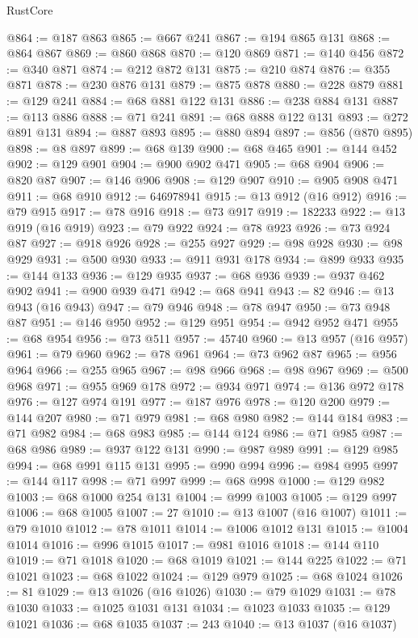 \begin{lexlean}{RustCore}
\begin{coremodule}
@864 := @187 @863
@865 := @667 @241
@867 := @194 @865 @131
@868 := @864 @867
@869 := @860 @868
@870 := @120 @869
@871 := @140 @456
@872 := @340 @871
@874 := @212 @872 @131
@875 := @210 @874
@876 := @355 @871
@878 := @230 @876 @131
@879 := @875 @878
@880 := @228 @879
@881 := @129 @241
@884 := @68 @881 @122 @131
@886 := @238 @884 @131
@887 := @113 @886
@888 := @71 @241
@891 := @68 @888 @122 @131
@893 := @272 @891 @131
@894 := @887 @893
@895 := @880 @894
@897 := @856 (@870 @895)
@898 := @8 @897
@899 := @68 @139
@900 := @68 @465
@901 := @144 @452
@902 := @129 @901
@904 := @900 @902 @471
@905 := @68 @904
@906 := @820 @87
@907 := @146 @906
@908 := @129 @907
@910 := @905 @908 @471
@911 := @68 @910
@912 := 646978941
@915 := @13 @912 (@16 @912)
@916 := @79 @915
@917 := @78 @916
@918 := @73 @917
@919 := 182233
@922 := @13 @919 (@16 @919)
@923 := @79 @922
@924 := @78 @923
@926 := @73 @924 @87
@927 := @918 @926
@928 := @255 @927
@929 := @98 @928
@930 := @98 @929
@931 := @500 @930
@933 := @911 @931 @178
@934 := @899 @933
@935 := @144 @133
@936 := @129 @935
@937 := @68 @936
@939 := @937 @462 @902
@941 := @900 @939 @471
@942 := @68 @941
@943 := 82
@946 := @13 @943 (@16 @943)
@947 := @79 @946
@948 := @78 @947
@950 := @73 @948 @87
@951 := @146 @950
@952 := @129 @951
@954 := @942 @952 @471
@955 := @68 @954
@956 := @73 @511
@957 := 45740
@960 := @13 @957 (@16 @957)
@961 := @79 @960
@962 := @78 @961
@964 := @73 @962 @87
@965 := @956 @964
@966 := @255 @965
@967 := @98 @966
@968 := @98 @967
@969 := @500 @968
@971 := @955 @969 @178
@972 := @934 @971
@974 := @136 @972 @178
@976 := @127 @974 @191
@977 := @187 @976
@978 := @120 @200
@979 := @144 @207
@980 := @71 @979
@981 := @68 @980
@982 := @144 @184
@983 := @71 @982
@984 := @68 @983
@985 := @144 @124
@986 := @71 @985
@987 := @68 @986
@989 := @937 @122 @131
@990 := @987 @989
@991 := @129 @985
@994 := @68 @991 @115 @131
@995 := @990 @994
@996 := @984 @995
@997 := @144 @117
@998 := @71 @997
@999 := @68 @998
@1000 := @129 @982
@1003 := @68 @1000 @254 @131
@1004 := @999 @1003
@1005 := @129 @997
@1006 := @68 @1005
@1007 := 27
@1010 := @13 @1007 (@16 @1007)
@1011 := @79 @1010
@1012 := @78 @1011
@1014 := @1006 @1012 @131
@1015 := @1004 @1014
@1016 := @996 @1015
@1017 := @981 @1016
@1018 := @144 @110
@1019 := @71 @1018
@1020 := @68 @1019
@1021 := @144 @225
@1022 := @71 @1021
@1023 := @68 @1022
@1024 := @129 @979
@1025 := @68 @1024
@1026 := 81
@1029 := @13 @1026 (@16 @1026)
@1030 := @79 @1029
@1031 := @78 @1030
@1033 := @1025 @1031 @131
@1034 := @1023 @1033
@1035 := @129 @1021
@1036 := @68 @1035
@1037 := 243
@1040 := @13 @1037 (@16 @1037)

\end{coremodule}
\end{lexlean}
